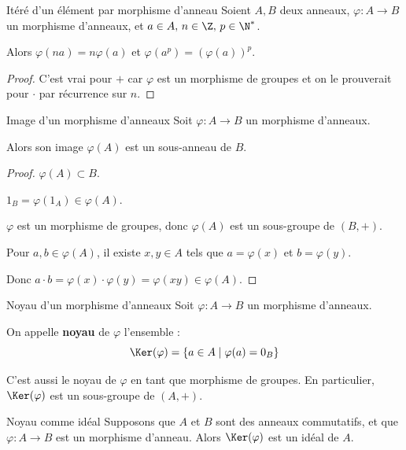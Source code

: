 \begin{proposition}{Itéré d'un élément par morphisme d'anneau}{}
    Soient $A, B$ deux anneaux, $\varphi : A \to B$ un morphisme d'anneaux, 
    et ${a \in A}, \, {n \in \Z}, \, {p \in \N^*}$. 

    Alors $\varphi(na) = n \varphi(a)$ et $\varphi(a^p) = (\varphi(a))^p$.
\end{proposition}

\begin{proof}
    C'est vrai pour $+$ car $\varphi$ est un morphisme de groupes et on le prouverait pour $\cdot$ par récurrence sur $n$.
\end{proof}

\begin{proposition}{Image d'un morphisme d'anneaux}{}
    Soit $\varphi : A \to B$ un morphisme d'anneaux. 

    Alors son image $\varphi(A)$ est un sous-anneau de $B$.
\end{proposition}

\begin{proof}
    $\varphi(A) \subset B$.

    $1_B = \varphi(1_A) \in \varphi(A)$.

    $\varphi$ est un morphisme de groupes, donc $\varphi(A)$ est un sous-groupe de $(B, +)$.

    Pour $a, b \in \varphi(A)$, il existe $x, y \in A$ tels que $a = \varphi(x)$ et $b = \varphi(y)$.

    Donc $a \cdot b = \varphi(x) \cdot \varphi(y) = \varphi(xy) \in \varphi(A)$.
\end{proof}

\begin{definition}{Noyau d'un morphisme d'anneaux}{}
    Soit $\varphi : A \to B$ un morphisme d'anneaux. 

    On appelle \textbf{noyau} de $\varphi$ l'ensemble :
    \[\Ker(\varphi) = \{a \in A \mid \varphi(a) = 0_B\}\]

    C'est aussi le noyau de $\varphi$ en tant que morphisme de groupes. En particulier, 
    $\Ker(\varphi)$ est un sous-groupe de $(A, +)$.
\end{definition}

\begin{proposition}{Noyau comme idéal}{}
    Supposons que $A$ et $B$ sont des anneaux commutatifs, et que $\varphi: A \to B$ est un morphisme d'anneau. 
    Alors $\Ker(\varphi)$ est un idéal de $A$.
\end{proposition}

